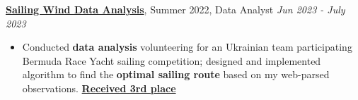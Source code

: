 \noindent\href{https://github.com/anton-mel/PredictWind}{\textbf{Sailing Wind Data Analysis}}, Summer 2022, Data Analyst
\hfill \textcolor[RGB]{153, 153, 153}{\textit{Jun 2023 - July 2023}}
\begin{itemize}[topsep=1pt]
\setlength\itemsep{-0.3em}
  \item{} Conducted \textbf{data analysis} volunteering for an Ukrainian team participating Bermuda Race Yacht sailing competition; designed and implemented algorithm to find the \textbf{optimal sailing route} based on my web-parsed observations. \href{https://yachtscoring.com/event_results_cumulative.cfm?eID=14646}{\textbf{Received 3rd place}}
\end{itemize}\vspace{-2ex}
